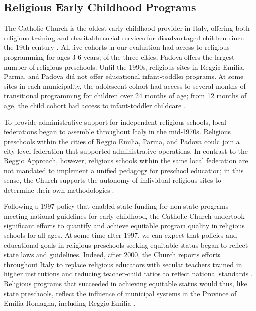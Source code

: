 \subsection{Religious Early Childhood Programs}

The Catholic Church is the oldest early childhood provider in Italy, offering both religious training and charitable social services for disadvantaged children since the 19th century \citep{OECD_2001_Italy-Country-Note}. All five cohorts in our evaluation had access to religious programming for ages 3-6 years; of the three cities, Padova offers the largest number of religious preschools. Until the 1990s, religious sites in Reggio Emilia, Parma, and Padova did not offer educational infant-toddler programs. At some sites in each municipality, the adolescent cohort had access to several months of transitional programming for children over 24 months of age; from 12 months of age, the child cohort had access to infant-toddler childcare \citep{Malizia-Cicatelli_2011_BOOK_Catholic-School,CEHD_2016_Historical-Analysis}.

To provide administrative support for independent religious schools, local federations began to assemble throughout Italy in the mid-1970s. Religious preschools within the cities of Reggio Emilia, Parma, and Padova could join a city-level federation that supported administrative operations. In contrast to the Reggio Approach, however, religious schools within the same local federation are not mandated to implement a unified pedagogy for preschool education; in this sense, the Church supports the autonomy of individual religious sites to determine their own methodologies \citep{Malizia-Cicatelli_2011_BOOK_Catholic-School}. 

Following a 1997 policy that enabled state funding for non-state programs meeting national guidelines for early childhood, the Catholic Church undertook significant efforts to quantify and achieve equitable program quality in religious schools for all ages. At some time after 1997, we can expect that policies and educational goals in religious preschools seeking equitable status began to reflect state laws and guidelines. Indeed, after 2000, the Church reports efforts throughout Italy to replace religious educators with secular teachers trained in higher institutions and reducing teacher-child ratios to reflect national standards \citep{Malizia-Cicatelli_2011_BOOK_Catholic-School}. Religious programs that succeeded in achieving equitable status would thus, like state preschools, reflect the influence of municipal systems in the Province of Emilia Romagna, including Reggio Emilia \citep{Hohnerlein_2009_Paradox-Public-Preschools,OECD_2001_Italy-Country-Note}. 

